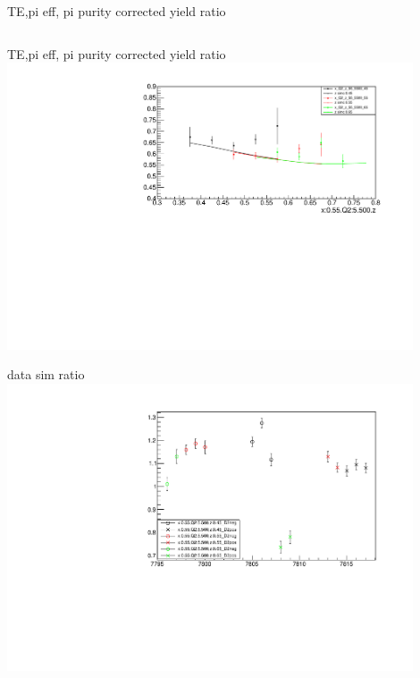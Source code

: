 \begin{frame}{TE,pi eff, pi purity corrected yield ratio}
\begin{columns}
\begin{column}[T]{0.5\textwidth}
\end{column}
\begin{column}[T]{0.5\textwidth}
\end{column}
\end{columns}
\end{frame}
\begin{frame}{TE,pi eff, pi purity corrected yield ratio}
\includegraphics[width = 0.9\textwidth]{results/yield/statistics_corr/x_Q2_55_5500_ratio.pdf}
\end{frame}
\begin{frame}{data sim ratio}
    \includegraphics[width = 0.9\textwidth]{results/yield/run_info_pdf/x_Q2_55_5500_data_simc_ratio.pdf}
\end{frame}
